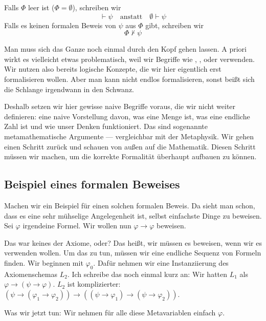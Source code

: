 \begin{math-stroke}
Falls $\Phi$ leer ist ($\Phi = \emptyset$), schreiben wir
\[
\vdash \psi \quad \text{anstatt} \quad \emptyset \vdash \psi
\]
Falls es keinen formalen Beweis von $\psi$ aus $\Phi$ gibt, schreiben wir
\[
\Phi \not\vdash \psi
\]
\end{math-stroke}

\begin{spoken-clean}[00:31:22 - 00:32:47]
Man muss sich das Ganze noch einmal durch den Kopf gehen lassen. A priori wirkt es vielleicht etwas problematisch, weil wir Begriffe wie , ,  oder  verwenden. Wir nutzen also bereits logische Konzepte, die wir hier eigentlich erst formalisieren wollen. Aber man kann nicht endlos formalisieren, sonst beißt sich die Schlange irgendwann in den Schwanz.

Deshalb setzen wir hier gewisse naive Begriffe voraus, die wir nicht weiter definieren: eine naive Vorstellung davon, was eine Menge ist, was eine endliche Zahl ist und wie unser Denken funktioniert. Das sind sogenannte metamathematische Argumente --- vergleichbar mit der Metaphysik. Wir gehen einen Schritt zurück und schauen von außen auf die Mathematik. Diesen Schritt müssen wir machen, um die korrekte Formalität überhaupt aufbauen zu können.
\end{spoken-clean}

\subsection{Beispiel eines formalen Beweises}

\begin{spoken-clean}[00:32:47 - 00:34:50]
Machen wir ein Beispiel für einen solchen formalen Beweis. Da sieht man schon, dass es eine sehr mühselige Angelegenheit ist, selbst einfachste Dinge zu beweisen. Sei $\varphi$ irgendeine Formel. Wir wollen nun $\varphi \to \varphi$ beweisen.

Das war keines der Axiome, oder? Das heißt, wir müssen es beweisen, wenn wir es verwenden wollen. Um das zu tun, müssen wir eine endliche Sequenz von Formeln finden. Wir beginnen mit $\varphi_0$. Dafür nehmen wir eine Instanziierung des Axiomenschemas $L_2$. Ich schreibe das noch einmal kurz an: Wir hatten $L_1$ als $\varphi \to (\psi \to \varphi)$. $L_2$ ist komplizierter: $(\psi \to (\varphi_1 \to \varphi_2)) \to ((\psi \to \varphi_1) \to (\psi \to \varphi_2))$.

Was wir jetzt tun: Wir nehmen für alle diese Metavariablen einfach $\varphi$.
\end{spoken-clean}


